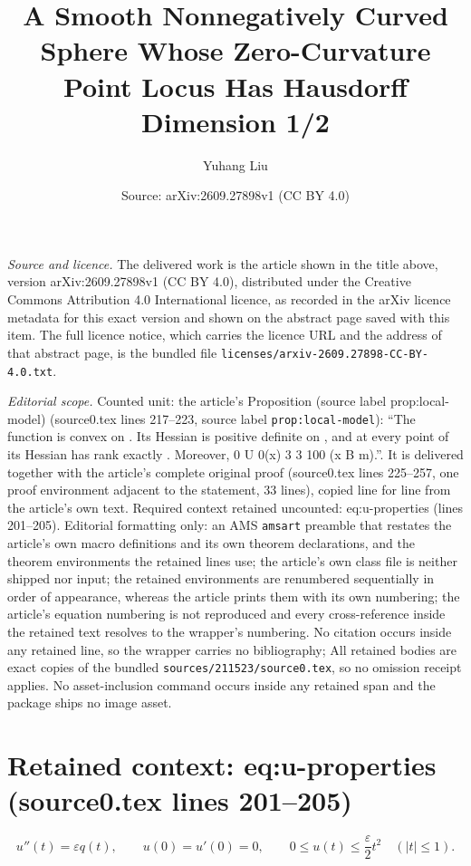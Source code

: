\documentclass[10pt,a4paper]{amsart}
\title[A Smooth Nonnegatively Curved Sphere Whose Zero-Curvature Point Locus Has Hausdorff Dimension 1/2]{A Smooth Nonnegatively Curved Sphere Whose Zero-Curvature Point Locus Has Hausdorff Dimension 1/2}
\author{Yuhang Liu}
\date{Source: arXiv:2609.27898v1 (CC BY 4.0)}
\theoremstyle{plain}
\theoremstyle{remark}
\begin{document}
\maketitle

\noindent\emph{Source and licence.} The delivered work is the article shown in the title above, version arXiv:2609.27898v1 (CC BY 4.0), distributed under the Creative Commons Attribution 4.0 International licence, as recorded in the arXiv licence metadata for this exact version and shown on the abstract page saved with this item. The full licence notice, which carries the licence URL and the address of that abstract page, is the bundled file \texttt{licenses/arxiv-2609.27898-CC-BY-4.0.txt}.
\par\smallskip

\noindent\textit{Editorial scope.} Counted unit: the article's Proposition (source label prop:local-model) (source0.tex lines 217--223, source label \texttt{prop:local-model}): ``The function is convex on . Its Hessian is positive definite on , and at every point of its Hessian has rank exactly . Moreover, 0 U 0(x) 3 3 100 (x B m).''. It is delivered together with the article's complete original proof (source0.tex lines 225--257, one proof environment adjacent to the statement, 33 lines), copied line for line from the article's own text. Required context retained uncounted: eq:u-properties (lines 201--205). Editorial formatting only: an AMS \texttt{amsart} preamble that restates the article's own macro definitions and its own theorem declarations, and the theorem environments the retained lines use; the article's own class file is neither shipped nor input; the retained environments are renumbered sequentially in order of appearance, whereas the article prints them with its own numbering; the article's equation numbering is not reproduced and every cross-reference inside the retained text resolves to the wrapper's numbering. No citation occurs inside any retained line, so the wrapper carries no bibliography; All retained bodies are exact copies of the bundled \texttt{sources/211523/source0.tex}, so no omission receipt applies. No asset-inclusion command occurs inside any retained span and the package ships no image asset.


\section*{Retained context: eq:u-properties (source0.tex lines 201--205)}

\begin{equation}\label{eq:u-properties}
 u''(t)=\varepsilon q(t),\qquad u(0)=u'(0)=0,
 \qquad 0\leq u(t)\leq\frac\varepsilon2t^2
 \quad (|t|\leq1).
\end{equation}
\end{document}
